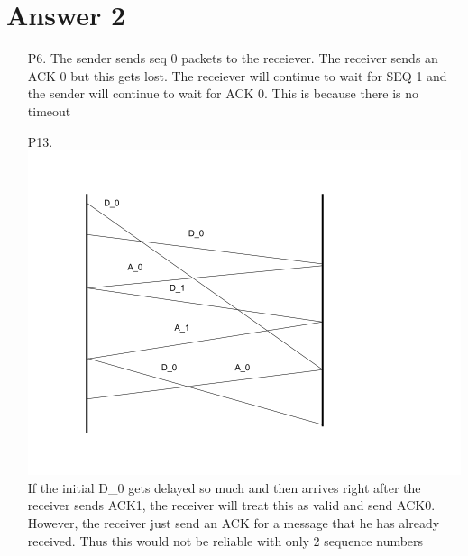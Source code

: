 \documentclass[11pt]{article}
\theoremstyle{definition}
\begin{document}
\section*{Answer 2}
\begin{enumerate}
\item[P6.]
The sender sends seq 0 packets to the receiever.  The receiver sends an ACK 0 but this gets lost.  The receiever will continue to wait for SEQ 1 and the sender will continue to wait for ACK 0.  This is because there is no timeout

\item[P13.]
\includegraphics[scale=0.5]{P13}\\
If the initial D\_0 gets delayed so much and then arrives right after the receiver sends ACK1, the receiver will treat this as valid and send ACK0.  However, the receiver just send an ACK for a message that he has already received.  Thus this would not be reliable with only 2 sequence numbers



\end{enumerate}
\end{document}
